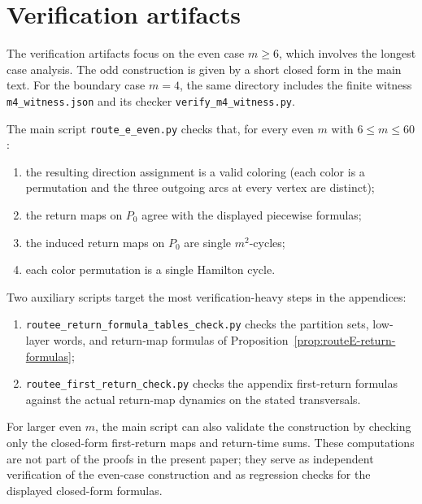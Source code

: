 \documentclass[11pt]{article}
\begin{document}
\section{Verification artifacts}\label{app:verification}

The verification artifacts focus on the even case $m\ge 6$, which involves the longest case analysis.
The odd construction is given by a short closed form in the main text.
For the boundary case $m=4$, the same directory includes the finite witness \texttt{m4\_witness.json} and its checker \texttt{verify\_m4\_witness.py}.

The main script \texttt{route\_e\_even.py} checks that, for every even $m$ with $6\le m\le 60$:
\begin{enumerate}[leftmargin=2.2em]
\item the resulting direction assignment is a valid coloring (each color is a permutation and the three outgoing arcs at every vertex are distinct);
\item the return maps on $P_0$ agree with the displayed piecewise formulas;
\item the induced return maps on $P_0$ are single $m^2$-cycles;
\item each color permutation is a single Hamilton cycle.
\end{enumerate}
Two auxiliary scripts target the most verification-heavy steps in the appendices:
\begin{enumerate}[leftmargin=2.2em,label=(\alph*)]
\item \texttt{routee\_return\_formula\_tables\_check.py} checks the partition sets, low-layer words, and return-map formulas of Proposition~\ref{prop:routeE-return-formulas};
\item \texttt{routee\_first\_return\_check.py} checks the appendix first-return formulas against the actual return-map dynamics on the stated transversals.
\end{enumerate}
For larger even $m$, the main script can also validate the construction by checking only the closed-form first-return maps and return-time sums.
These computations are not part of the proofs in the present paper; they serve as independent verification of the even-case construction and as regression checks for the displayed closed-form formulas.
\end{document}
